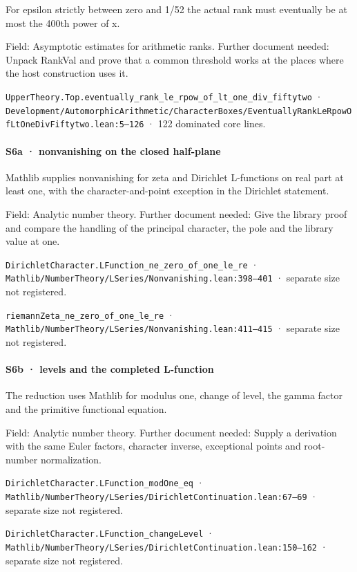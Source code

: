 For epsilon strictly between zero and 1/52 the actual rank must eventually be at most the 400th power of x.

Field: Asymptotic estimates for arithmetic ranks. Further document needed: Unpack RankVal and prove that a common threshold works at the places where the host construction uses it.

\nolinkurl{UpperTheory.Top.eventually_rank_le_rpow_of_lt_one_div_fiftytwo} · \nolinkurl{Development/AutomorphicArithmetic/CharacterBoxes/EventuallyRankLeRpowOfLtOneDivFiftytwo.lean:5–126} · 122 dominated core lines.

\paragraph{S6a · nonvanishing on the closed half-plane}

Mathlib supplies nonvanishing for zeta and Dirichlet L-functions on real part at least one, with the character-and-point exception in the Dirichlet statement.

Field: Analytic number theory. Further document needed: Give the library proof and compare the handling of the principal character, the pole and the library value at one.

\nolinkurl{DirichletCharacter.LFunction_ne_zero_of_one_le_re} · \nolinkurl{Mathlib/NumberTheory/LSeries/Nonvanishing.lean:398–401} · separate size not registered.

\nolinkurl{riemannZeta_ne_zero_of_one_le_re} · \nolinkurl{Mathlib/NumberTheory/LSeries/Nonvanishing.lean:411–415} · separate size not registered.

\paragraph{S6b · levels and the completed L-function}

The reduction uses Mathlib for modulus one, change of level, the gamma factor and the primitive functional equation.

Field: Analytic number theory. Further document needed: Supply a derivation with the same Euler factors, character inverse, exceptional points and root-number normalization.

\nolinkurl{DirichletCharacter.LFunction_modOne_eq} · \nolinkurl{Mathlib/NumberTheory/LSeries/DirichletContinuation.lean:67–69} · separate size not registered.

\nolinkurl{DirichletCharacter.LFunction_changeLevel} · \nolinkurl{Mathlib/NumberTheory/LSeries/DirichletContinuation.lean:150–162} · separate size not registered.

